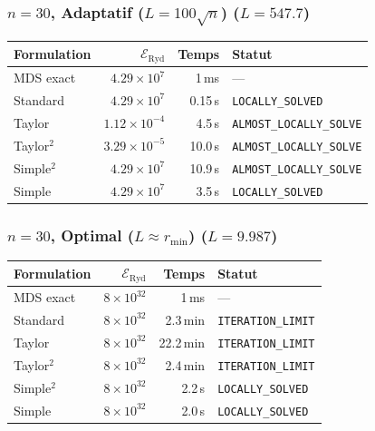 \subsubsection{$n=30$, Adaptatif ($L{=}100\sqrt{n}$) ($L=547.7$)}
\begin{longtable}{@{}lrrl@{}}
  \toprule
  Formulation & $\mathcal{E}_{\mathrm{Ryd}}$ & Temps & Statut \\
  \midrule
  \endhead
  MDS exact & $4.29\times10^{7}$ & 1\,ms & --- \\
  Standard & $4.29\times10^{7}$ & 0.15\,s & \texttt{LOCALLY\_SOLVED} \\
  Taylor & $1.12\times10^{-4}$ & 4.5\,s & \texttt{ALMOST\_LOCALLY\_SOLVE} \\
  Taylor$^2$ & $3.29\times10^{-5}$ & 10.0\,s & \texttt{ALMOST\_LOCALLY\_SOLVE} \\
  Simple$^2$ & $4.29\times10^{7}$ & 10.9\,s & \texttt{ALMOST\_LOCALLY\_SOLVE} \\
  Simple & $4.29\times10^{7}$ & 3.5\,s & \texttt{LOCALLY\_SOLVED} \\
  \bottomrule
\end{longtable}

\subsubsection{$n=30$, Optimal ($L{\approx}r_{\min}$) ($L=9.987$)}
\begin{longtable}{@{}lrrl@{}}
  \toprule
  Formulation & $\mathcal{E}_{\mathrm{Ryd}}$ & Temps & Statut \\
  \midrule
  \endhead
  MDS exact & $8\times10^{32}$ & 1\,ms & --- \\
  Standard & $8\times10^{32}$ & 2.3\,min & \texttt{ITERATION\_LIMIT} \\
  Taylor & $8\times10^{32}$ & 22.2\,min & \texttt{ITERATION\_LIMIT} \\
  Taylor$^2$ & $8\times10^{32}$ & 2.4\,min & \texttt{ITERATION\_LIMIT} \\
  Simple$^2$ & $8\times10^{32}$ & 2.2\,s & \texttt{LOCALLY\_SOLVED} \\
  Simple & $8\times10^{32}$ & 2.0\,s & \texttt{LOCALLY\_SOLVED} \\
  \bottomrule
\end{longtable}

